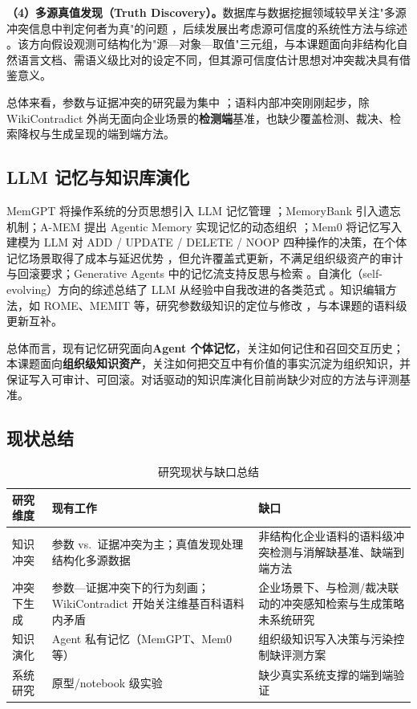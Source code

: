 \textbf{（4）多源真值发现（Truth Discovery）。}数据库与数据挖掘领域较早关注"多源冲突信息中判定何者为真"的问题 \cite{yin2008}，后续发展出考虑源可信度的系统性方法与综述 \cite{li2015}。该方向假设观测可结构化为"源—对象—取值"三元组，与本课题面向非结构化自然语言文档、需语义级比对的设定不同，但其源可信度估计思想对冲突裁决具有借鉴意义。

总体来看，参数与证据冲突的研究最为集中 \cite{xu2024survey}；语料内部冲突刚刚起步，除 WikiContradict 外尚无面向企业场景的\textbf{检测端}基准，也缺少覆盖检测、裁决、检索降权与生成呈现的端到端方法。

\subsection{LLM 记忆与知识库演化}

MemGPT 将操作系统的分页思想引入 LLM 记忆管理 \cite{packer2023}；MemoryBank 引入遗忘机制；A-MEM 提出 Agentic Memory 实现记忆的动态组织 \cite{xu2025amem}；Mem0 将记忆写入建模为 LLM 对 ADD / UPDATE / DELETE / NOOP 四种操作的决策，在个体记忆场景取得了成本与延迟优势 \cite{chhablani2025}，但允许覆盖式更新，不满足组织级资产的审计与回滚要求；Generative Agents 中的记忆流支持反思与检索 \cite{park2023}。自演化（self-evolving）方向的综述总结了 LLM 从经验中自我改进的各类范式 \cite{tao2024}。知识编辑方法，如 ROME、MEMIT 等，研究参数级知识的定位与修改 \cite{meng2022}，与本课题的语料级更新互补。

总体而言，现有记忆研究面向\textbf{Agent 个体记忆}，关注如何记住和召回交互历史；本课题面向\textbf{组织级知识资产}，关注如何把交互中有价值的事实沉淀为组织知识，并保证写入可审计、可回滚。对话驱动的知识库演化目前尚缺少对应的方法与评测基准。

\subsection{现状总结}

\begin{table}[htbp]
  \centering
  \caption{研究现状与缺口总结}
  \begin{tabular}{p{}p{}p{}}
    \toprule
    研究维度 & 现有工作 & 缺口 \\
    \midrule
    知识冲突 & 参数 vs.\ 证据冲突为主；真值发现处理结构化多源数据 & 非结构化企业语料的语料级冲突检测与消解缺基准、缺端到端方法 \\
    冲突下生成 & 参数—证据冲突下的行为刻画；WikiContradict 开始关注维基百科语料内矛盾 & 企业场景下、与检测/裁决联动的冲突感知检索与生成策略未系统研究 \\
    知识演化 & Agent 私有记忆（MemGPT、Mem0 等） & 组织级知识写入决策与污染控制缺评测方案 \\
    系统研究 & 原型/notebook 级实验 & 缺少真实系统支撑的端到端验证 \\
    \bottomrule
  \end{tabular}
\end{table}


